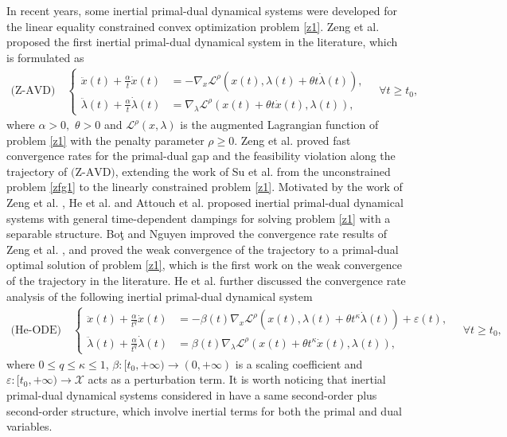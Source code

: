 \documentclass[review]{elsarticle}
\begin{document}
In recent years, some inertial primal-dual dynamical systems  were developed for  the linear equality constrained convex optimization problem \eqref{z1}.  Zeng et al. \cite{ZengXLandLeiJLandChenJ(2022)} proposed the first inertial primal-dual dynamical system in the literature,  which is formulated as 
\begin{eqnarray*}
	\text{(Z-AVD)}\quad
	\begin{cases}
		\ddot{x}(t)+\frac{\alpha}{t}\dot{x}(t)&=-\nabla_x\mathcal{L}^{\rho}(x(t),\lambda(t)+\theta t\dot{\lambda}(t)),\\
		\ddot{\lambda}(t)+\frac{\alpha}{t}\dot{\lambda}(t)&=\nabla_{\lambda}\mathcal{L}^{\rho}(x(t)+\theta t\dot{x}(t),\lambda(t)),
	\end{cases}\quad\forall t\ge t_0,
\end{eqnarray*}
where $\alpha>0,$ $\theta>0$ and  $\mathcal{L}^{\rho}(x, \lambda)$ is the augmented Lagrangian function of problem \eqref{z1} with the penalty parameter  $\rho\ge 0$. Zeng et al. \cite{ZengXLandLeiJLandChenJ(2022)} proved  fast convergence rates for the primal-dual gap and the feasibility violation along the trajectory of $\text{(Z-AVD)}$,  extending the work of Su et al. \cite{SuBoydandCandes(2016)} from the unconstrained problem \eqref{zfg1} to the linearly constrained problem \eqref{z1}. Motivated by the work of  Zeng et al. \cite{ZengXLandLeiJLandChenJ(2022)},  He et al. \cite{HeHuFangetal(2021)} and Attouch et al. \cite{AttouchADMM(2022)}  proposed inertial primal-dual dynamical systems with general time-dependent dampings for solving problem \eqref{z1} with a separable structure.   Bo{\c t} and Nguyen \cite{BNguyen2022} improved the convergence rate results of Zeng et al. \cite{ZengXLandLeiJLandChenJ(2022)}, and  proved the  weak convergence  of the trajectory to a primal-dual optimal solution of problem \eqref{z1}, which is the first work on the weak convergence of the trajectory  in the literature. He et al. \cite{HHFIPD2023} further discussed the  convergence rate analysis of the following  inertial primal-dual dynamical system
	\begin{eqnarray*}
		\text{(He-ODE)}\quad
		\begin{cases}
			\ddot{x}(t)+\frac{\alpha}{t^q}\dot{x}(t)&=-\beta(t)\nabla_x\mathcal{L}^{\rho}(x(t),\lambda(t)+\theta t^{\kappa}\dot{\lambda}(t))+\varepsilon(t),\\
			\ddot{\lambda}(t)+\frac{\alpha}{t^q}\dot{\lambda}(t)&=\beta(t)\nabla_{\lambda}\mathcal{L}^{\rho}(x(t)+\theta t^{\kappa}\dot{x}(t),\lambda(t)), 
		\end{cases}\quad\forall t\ge t_0,
	\end{eqnarray*}
	where $0\leq q\leq \kappa\leq1$, $\beta: [t_0, +\infty)\to (0, +\infty)$ is a scaling coefficient and $\varepsilon: [t_0, +\infty)\to \mathcal{X}$ acts as a perturbation term. It is worth noticing that inertial primal-dual dynamical systems considered in \cite{ZengXLandLeiJLandChenJ(2022),HeHuFangetal(2021), AttouchADMM(2022),BNguyen2022,HHFIPD2023} have a same second-order plus second-order structure,  which involve inertial terms for both the primal and dual variables. 
\end{document}
